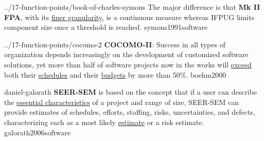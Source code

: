 \documentclass{article}
\begin{document}
\lnQuote
  {../17-function-points/book-of-charles-symons}
  {The major difference is that \textbf{Mk II FPA}, with its \ul{finer granularity}, is a continuous measure whereas IFPUG limits component size once a threshold is reached.}
  {symons1991software}

\lnQuote
  {../17-function-points/cocomo-2}
  {\textbf{COCOMO-II}: Success in all types of organization depends increasingly on the development of customized software solutions, yet more than half of software projects now in the works will \ul{exceed} both their \ul{schedules} and their \ul{budgets} by more than 50\%.}
  {boehm2000}


\lnQuote
  {daniel-galorath}
  {\textbf{SEER-SEM} is based on the concept that if a user can describe the \ul{essential characteristics} of a project and range of size, SEER-SEM can provide estimates of schedules, efforts, staffing, risks, uncertainties, and defects, characterizing each as a most likely \ul{estimate} or a risk estimate.}
  {galorath2006software}
\end{document}
